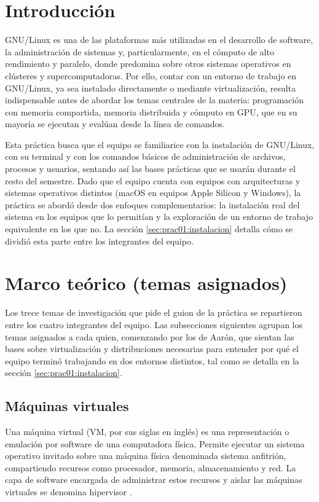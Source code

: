 \section{Introducción}
\label{sec:prac01:introduccion}

GNU/Linux es una de las plataformas más utilizadas en el desarrollo de software, la administración de sistemas y, particularmente, en el cómputo de alto rendimiento y paralelo, donde predomina sobre otros sistemas operativos en clústeres y supercomputadoras. Por ello, contar con un entorno de trabajo en GNU/Linux, ya sea instalado directamente o mediante virtualización, resulta indispensable antes de abordar los temas centrales de la materia: programación con memoria compartida, memoria distribuida y cómputo en GPU, que en su mayoría se ejecutan y evalúan desde la línea de comandos.

Esta práctica busca que el equipo se familiarice con la instalación de GNU/Linux, con su terminal y con los comandos básicos de administración de archivos, procesos y usuarios, sentando así las bases prácticas que se usarán durante el resto del semestre. Dado que el equipo cuenta con equipos con arquitecturas y sistemas operativos distintos (macOS en equipos Apple Silicon y Windows), la práctica se abordó desde dos enfoques complementarios: la instalación real del sistema en los equipos que lo permitían y la exploración de un entorno de trabajo equivalente en los que no. La sección \ref{sec:prac01:instalacion} detalla cómo se dividió esta parte entre los integrantes del equipo.

\section{Marco teórico (temas asignados)}
\label{sec:prac01:marco-teorico}

Los trece temas de investigación que pide el guion de la práctica se repartieron entre los cuatro integrantes del equipo. Las subsecciones siguientes agrupan los temas asignados a cada quien, comenzando por los de Aarón, que sientan las bases sobre virtualización y distribuciones necesarias para entender por qué el equipo terminó trabajando en dos entornos distintos, tal como se detalla en la sección \ref{sec:prac01:instalacion}.


\subsection{Máquinas virtuales}
Una máquina virtual (VM, por sus siglas en inglés) es una representación o emulación por software de una computadora física. Permite ejecutar un sistema operativo invitado sobre una máquina física denominada sistema anfitrión, compartiendo recursos como procesador, memoria, almacenamiento y red. La capa de software encargada de administrar estos recursos y aislar las máquinas virtuales se denomina hipervisor \cite{ibmvm}.

